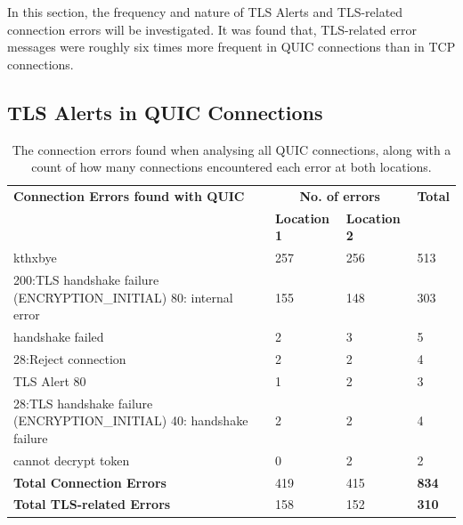 \documentclass{l4proj}
\begin{document}
In this section, the frequency and nature of TLS Alerts and TLS-related connection errors will be investigated. It was found that, TLS-related error messages were roughly six times more frequent in QUIC connections than in TCP connections. 

\subsection{TLS Alerts in QUIC Connections}


\begin{table}[hbtp]
    \caption{The connection errors found when analysing all QUIC connections, along with a count of how many connections encountered each error at both locations.}\label{tab:TLSErrors_QUIC}
    \centering
    \begin{tabular}{p{7cm}p{2cm}p{2cm}|p{1cm}}
    \textbf{Connection Errors found with QUIC}                              & \multicolumn{2}{c}{\textbf{No. of errors}}  & \textbf{Total} \\ 
    \textbf{}                                           & \textbf{Location 1} & \textbf{Location 2}         \\ \hline %
    kthxbye                                                                                   & 257           & 256 & 513             \\ 
    200:TLS handshake failure (ENCRYPTION\_INITIAL) 80: internal error                        & 155           & 148 & 303            \\
    handshake failed                                                                          & 2             & 3   & 5              \\
    28:Reject connection                                                                      & 2             & 2   & 4              \\
    TLS Alert 80                                                                              & 1             & 2   & 3              \\
    28:TLS handshake failure (ENCRYPTION\_INITIAL) 40: handshake failure                      & 2             & 2   & 4              \\
    cannot decrypt token                                                                      & 0             & 2   & 2              \\ \hline
    \textbf{Total Connection Errors}                                                          & 419           & 415 & \textbf{834}   \\ 
    \textbf{Total TLS-related Errors}                                                         & 158           & 152 & \textbf{310}  
    \end{tabular}
\end{table}
\end{document}
